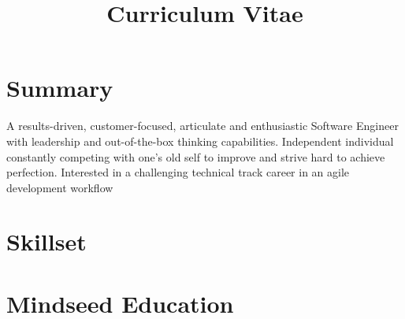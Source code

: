 \documentclass[11pt,a4paper,sans]{moderncv} %
\title{Curriculum Vitae}
\begin{document}
\makecvtitle %

\vspace{-15mm}

\section{Summary}

A results-driven, customer-focused, articulate and enthusiastic Software Engineer with leadership and out-of-the-box thinking capabilities. Independent individual constantly competing with one's old self to improve and strive hard to achieve perfection. Interested in a challenging technical track career in an agile development workflow

\begin{comment}

\section{Objective}

Intend to work in a responsible \& challenging environment which provides opportunities to learn, grow and utilize my potential and skills to its maximum.

\end{comment}

\section{Skillset}




\section{Mindseed Education}
\end{document}
